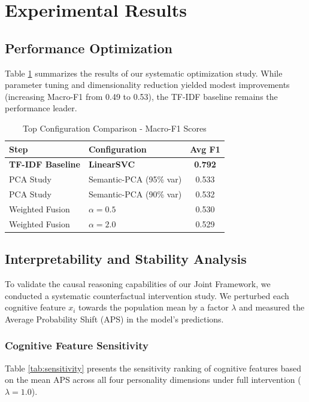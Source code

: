 \section{Experimental Results}

\subsection{Performance Optimization}
Table \ref{tab:optimization_comparison} summarizes the results of our systematic optimization study. While parameter tuning and dimensionality reduction yielded modest improvements (increasing Macro-F1 from 0.49 to 0.53), the TF-IDF baseline remains the performance leader.

\begin{table}[h]
\centering
\caption{Top Configuration Comparison - Macro-F1 Scores}
\label{tab:optimization_comparison}
\begin{tabular}{llc}
\hline
Step & Configuration & Avg F1 \\
\hline
\textbf{TF-IDF Baseline} & \textbf{LinearSVC} & \textbf{0.792} \\
PCA Study & Semantic-PCA (95\% var) & 0.533 \\
PCA Study & Semantic-PCA (90\% var) & 0.532 \\
Weighted Fusion & $\alpha=0.5$ & 0.530 \\
Weighted Fusion & $\alpha=2.0$ & 0.529 \\
\hline
\end{tabular}
\end{table}

\subsection{Interpretability and Stability Analysis}
To validate the causal reasoning capabilities of our Joint Framework, we conducted a systematic counterfactual intervention study. We perturbed each cognitive feature $x_i$ towards the population mean by a factor $\lambda$ and measured the Average Probability Shift (APS) in the model's predictions.

\subsubsection{Cognitive Feature Sensitivity}
Table \ref{tab:sensitivity} presents the sensitivity ranking of cognitive features based on the mean APS across all four personality dimensions under full intervention ($\lambda=1.0$).

